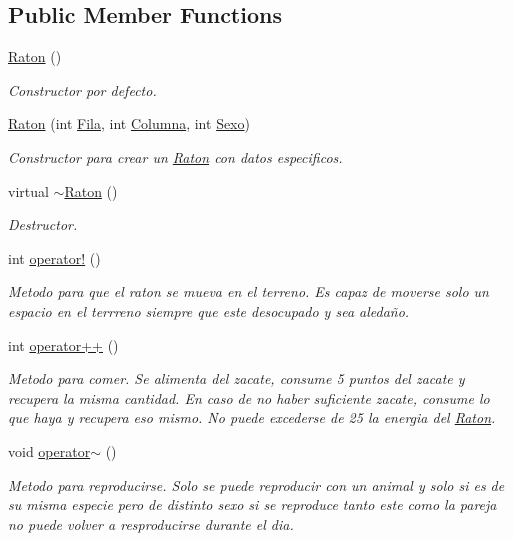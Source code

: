 \subsection*{Public Member Functions}
\begin{DoxyCompactItemize}
\item 
\hyperlink{classRaton_a9981955d139254e7a3990ebbf4d6d6d2}{Raton} ()
\begin{DoxyCompactList}\small\item\em Constructor por defecto. \end{DoxyCompactList}\item 
\hyperlink{classRaton_abd3b46771d6db783f207274aab538783}{Raton} (int \hyperlink{classAnimal_ab403adfd13b57143eff123bdd6a2febb}{Fila}, int \hyperlink{classAnimal_a340d64e6e4ffe5f35e0855c63aad1bd3}{Columna}, int \hyperlink{classAnimal_a42b629ae5a7e0c05263a3f6e592ea116}{Sexo})
\begin{DoxyCompactList}\small\item\em Constructor para crear un \hyperlink{classRaton}{Raton} con datos especificos. \end{DoxyCompactList}\item 
virtual \hyperlink{classRaton_a65e9e02f328adbda8d588548a3b1d76b}{$\sim$\+Raton} ()
\begin{DoxyCompactList}\small\item\em Destructor. \end{DoxyCompactList}\item 
int \hyperlink{classRaton_ad50cebe48f49dbadef570d616a0e6aa3}{operator!} ()
\begin{DoxyCompactList}\small\item\em Metodo para que el raton se mueva en el terreno. Es capaz de moverse solo un espacio en el terrreno siempre que este desocupado y sea aledaño. \end{DoxyCompactList}\item 
int \hyperlink{classRaton_a64ec37f911376e16802ad5906bb4e27a}{operator++} ()
\begin{DoxyCompactList}\small\item\em Metodo para comer. Se alimenta del zacate, consume 5 puntos del zacate y recupera la misma cantidad. En caso de no haber suficiente zacate, consume lo que haya y recupera eso mismo. No puede excederse de 25 la energia del \hyperlink{classRaton}{Raton}. \end{DoxyCompactList}\item 
void \hyperlink{classRaton_a7ec71ea95a98d13bf2cccf108b3c76d6}{operator$\sim$} ()
\begin{DoxyCompactList}\small\item\em Metodo para reproducirse. Solo se puede reproducir con un animal y solo si es de su misma especie pero de distinto sexo si se reproduce tanto este como la pareja no puede volver a resproducirse durante el dia. \end{DoxyCompactList}\end{DoxyCompactItemize}
